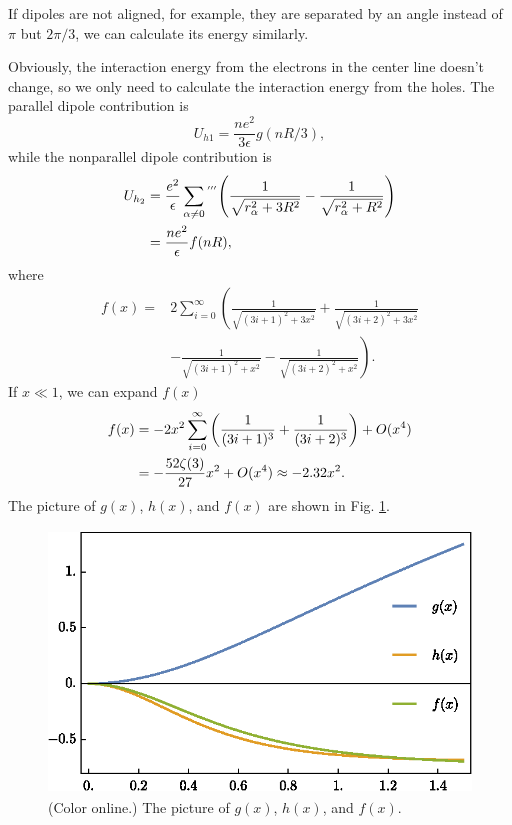 \documentclass[10pt]{article}
\begin{document}
If dipoles are not aligned, for example, they are separated by an angle instead of $\pi$ but $2\pi/3$, we can calculate its energy similarly.

Obviously, the interaction energy from the electrons in the center line doesn't change, so we only need to calculate the interaction energy from the holes. The parallel dipole contribution is
\begin{equation}
	U_{h1} = \frac{ne^2}{3\epsilon} g(nR/3),
\end{equation}
while the nonparallel dipole contribution is
\begin{align*}
	U_{h_2} &= \frac{e^2}{\epsilon} \sum_{\alpha \neq 0}{}^{'''} \qty(\frac{1}{\sqrt{r_{\alpha}^2 + 3R^2}} - \frac{1}{\sqrt{r_{\alpha}^2 + R^2}}) \\
	&= \frac{ne^2}{\epsilon} f(nR),
\end{align*}
where
\begin{align*}
	f(x) =& 2\sum_{i=0}^{\infty} \left(\frac{1}{\sqrt{(3i+1)^2 + 3x^2}} + \frac{1}{\sqrt{(3i+2)^2 + 3x^2}} \right.\\
	& \left.- \frac{1}{\sqrt{(3i+1)^2 + x^2}} - \frac{1}{\sqrt{(3i+2)^2 + x^2}} \right).
\end{align*}
If $x \ll 1$, we can expand $f(x)$
\begin{align*}
	f(x) &= -2x^2\sum_{i=0}^{\infty} \qty(\frac{1}{(3i+1)^3} + \frac{1}{(3i+2)^3}) +O(x^4)\\
	&=-\frac{52\zeta(3)}{27} x^2 + O(x^4) \approx -2.32x^2.
\end{align*}
The picture of $g(x)$, $h(x)$, and $f(x)$ are shown in Fig. \ref{fig: 1}.

\begin{figure}[H]
	\centering
	\includegraphics[height=7cm]{functions.eps}
	\caption{(Color online.) The picture of $g(x)$, $h(x)$, and $f(x)$.}
	\label{fig: 1}
\end{figure}
\end{document}
